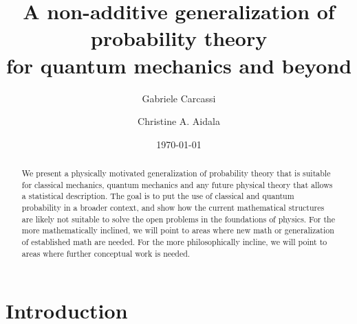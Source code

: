 \documentclass[10pt,twocolumn, nofootinbib]{revtex4-2}
\begin{document}
\title{A non-additive generalization of probability theory \\for quantum mechanics and beyond}
\author{Gabriele Carcassi}
\author{Christine A. Aidala}

\date{\today}


\begin{abstract}
	We present a physically motivated generalization of probability theory that is suitable for classical mechanics, quantum mechanics and any future physical theory that allows a statistical description. The goal is to put the use of classical and quantum probability in a broader context, and show how the current mathematical structures are likely not suitable to solve the open problems in the foundations of physics. For the more mathematically inclined, we will point to areas where new math or generalization of established math are needed. For the more philosophically incline, we will point to areas where further conceptual work is needed.
	
	
\end{abstract}

\maketitle


\section{Introduction}
\end{document}
